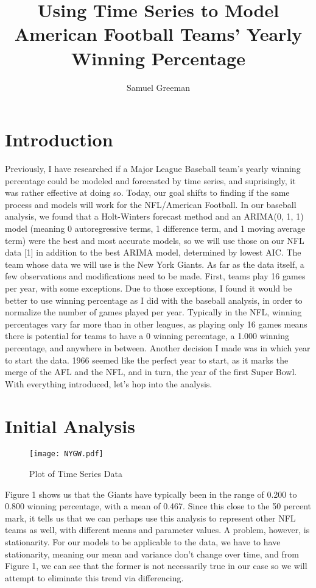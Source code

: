 \documentclass[12pt]{article}
\author{Samuel Greeman}
\title{Using Time Series to Model American Football Teams' Yearly Winning Percentage}
\begin{document}
\maketitle 



\setdefaultleftmargin{0pt}{}{}{}{}{}

\section{Introduction}\label{sec:intro}
Previously, I have researched if a Major League Baseball team's yearly winning percentage could be modeled and forecasted by time series, and suprisingly, it was rather effective at doing so. Today, our goal shifts to finding if the same process and models will work for the NFL/American Football. In our baseball analysis, we found that a Holt-Winters forecast method and an ARIMA(0, 1, 1) model (meaning 0 autoregressive terms, 1 difference term, and 1 moving average term) were the best and most accurate models, so we will use those on our NFL data [1] in addition to the best ARIMA model, determined by lowest AIC. The team whose data we will use is the New York Giants. As far as the data itself, a few observations and modifications need to be made. First, teams play 16 games per year, with some exceptions. Due to those exceptions, I found it would be better to use winning percentage as I did with the baseball analysis, in order to normalize the number of games played per year. Typically in the NFL, winning percentages vary far more than in other leagues, as playing only 16 games means there is potential for teams to have a 0 winning percentage, a 1.000 winning percentage, and anywhere in between. Another decision I made was in which year to start the data. 1966 seemed like the perfect year to start, as it marks the merge of the AFL and the NFL, and in turn, the year of the first Super Bowl. With everything introduced, let's hop into the analysis.\\
\newpage

\section{Initial Analysis}\label{sec:chapter}
\begin{figure}[h!]
\centering
\texttt{[image: NYGW.pdf]}
\caption{Plot of Time Series Data}
\label{fig:Figure 1}
\end{figure}
Figure 1 shows us that the Giants have typically been in the range of 0.200 to 0.800 winning percentage, with a mean of 0.467. Since this close to the 50 percent mark, it tells us that we can perhaps use this analysis to represent other NFL teams as well, with different means and parameter values. A problem, however, is stationarity. For our models to be applicable to the data, we have to have stationarity, meaning our mean and variance don't change over time, and from Figure 1, we can see that the former is not necessarily true in our case so we will attempt to eliminate this trend via differencing.\\
\end{document}
